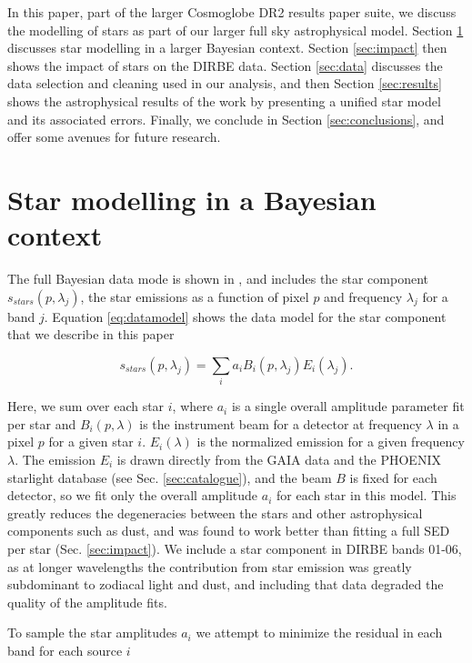 \documentclass{aa}
\begin{document}
In this paper, part of the larger Cosmoglobe DR2 results paper suite, we discuss the modelling of stars as part of our larger full sky astrophysical model. Section \ref{sec:models} discusses star modelling in a larger Bayesian context. Section \ref{sec:impact} then shows the impact of stars on the DIRBE data. Section \ref{sec:data} discusses the data selection and cleaning used in our analysis, and then Section \ref{sec:results} shows the astrophysical results of the work by presenting a unified star model and its associated errors. Finally, we conclude in Section \ref{sec:conclusions}, and offer some avenues for future research.

\section{Star modelling in a Bayesian context}
\label{sec:models}

The full Bayesian data mode is shown in \cite{CG02_01}, and includes the star component $s_{stars}(p, \lambda_j)$, the star emissions as a function of pixel $p$ and frequency $\lambda_j$ for a band $j$. Equation \ref{eq:datamodel} shows the data model for the star component that we describe in this paper

\begin{equation}
s_{stars}(p, \lambda_j) = \sum_i a_i B_i(p, \lambda_j) E_i(\lambda_j).
\label{eq:datamodel}
\end{equation}

Here, we sum over each star $i$, where $a_i$ is a single overall amplitude parameter fit per star and $B_i(p, \lambda)$ is the instrument beam for a detector at frequency $\lambda$ in a pixel $p$ for a given star $i$. $E_i(\lambda)$ is the normalized emission for a given frequency $\lambda$. The emission $E_i$ is drawn directly from the GAIA data and the PHOENIX starlight database (see Sec. \ref{sec:catalogue}), and the beam $B$ is fixed for each detector, so we fit only the overall amplitude $a_i$ for each star in this model. This greatly reduces the degeneracies between the stars and other astrophysical components such as dust, and was found to work better than fitting a full SED per star (Sec. \ref{sec:impact}). We include a star component in DIRBE bands 01-06, as at longer wavelengths the contribution from star emission was greatly subdominant to zodiacal light and dust, and including that data degraded the quality of the amplitude fits. 

To sample the star amplitudes $a_i$ we attempt to minimize the residual in each band for each source $i$
\end{document}
